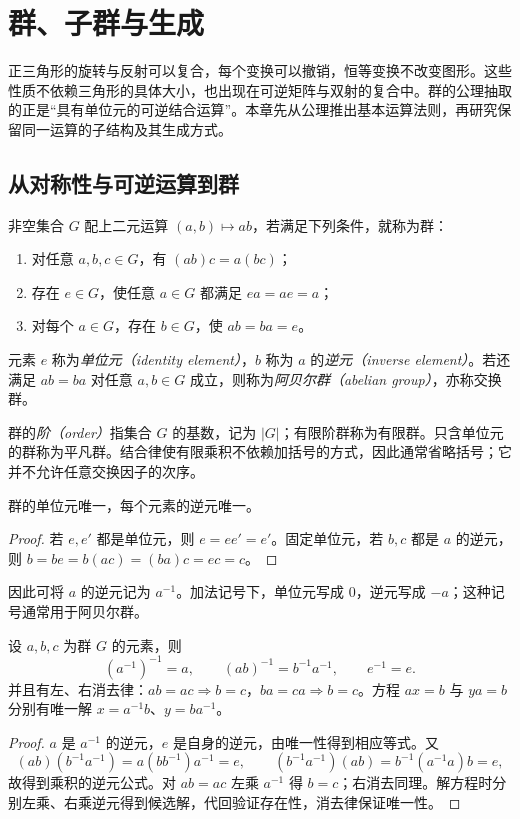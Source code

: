 \setcounter{chapter}{1} %
\chapter{群、子群与生成}\label{ch:groups}

正三角形的旋转与反射可以复合，每个变换可以撤销，恒等变换不改变图形。这些性质不依赖三角形的具体大小，也出现在可逆矩阵与双射的复合中。群的公理抽取的正是“具有单位元的可逆结合运算”。本章先从公理推出基本运算法则，再研究保留同一运算的子结构及其生成方式。

\section{从对称性与可逆运算到群}\label{sec:group-axioms}

\begin{definition}[群]
非空集合 $G$ 配上二元运算 $(a,b)\mapsto ab$，若满足下列条件，就称为群：
\begin{enumerate}
  \item 对任意 $a,b,c\in G$，有 $(ab)c=a(bc)$；
  \item 存在 $e\in G$，使任意 $a\in G$ 都满足 $ea=ae=a$；
  \item 对每个 $a\in G$，存在 $b\in G$，使 $ab=ba=e$。
\end{enumerate}
元素 $e$ 称为\emph{单位元（identity element）}，$b$ 称为 $a$ 的\emph{逆元（inverse element）}。若还满足 $ab=ba$ 对任意 $a,b\in G$ 成立，则称为\emph{阿贝尔群（abelian group）}，亦称交换群。
\end{definition}

群的\emph{阶（order）}指集合 $G$ 的基数，记为 $|G|$；有限阶群称为有限群。只含单位元的群称为平凡群。结合律使有限乘积不依赖加括号的方式，因此通常省略括号；它并不允许任意交换因子的次序。

\begin{proposition}[单位元与逆元的唯一性]\label{prop:group-uniqueness}
群的单位元唯一，每个元素的逆元唯一。
\end{proposition}
\begin{proof}
若 $e,e'$ 都是单位元，则 $e=ee'=e'$。固定单位元，若 $b,c$ 都是 $a$ 的逆元，则 $b=be=b(ac)=(ba)c=ec=c$。
\end{proof}

因此可将 $a$ 的逆元记为 $a^{-1}$。加法记号下，单位元写成 $0$，逆元写成 $-a$；这种记号通常用于阿贝尔群。

\begin{proposition}[基本运算法则]\label{prop:group-calculation}
设 $a,b,c$ 为群 $G$ 的元素，则
\[
  (a^{-1})^{-1}=a,\qquad (ab)^{-1}=b^{-1}a^{-1},\qquad e^{-1}=e.
\]
并且有左、右消去律：$ab=ac\Rightarrow b=c$，$ba=ca\Rightarrow b=c$。方程 $ax=b$ 与 $ya=b$ 分别有唯一解 $x=a^{-1}b$、$y=ba^{-1}$。
\end{proposition}
\begin{proof}
$a$ 是 $a^{-1}$ 的逆元，$e$ 是自身的逆元，由唯一性得到相应等式。又
\[
  (ab)(b^{-1}a^{-1})=a(bb^{-1})a^{-1}=e,\qquad
  (b^{-1}a^{-1})(ab)=b^{-1}(a^{-1}a)b=e,
\]
故得到乘积的逆元公式。对 $ab=ac$ 左乘 $a^{-1}$ 得 $b=c$；右消去同理。解方程时分别左乘、右乘逆元得到候选解，代回验证存在性，消去律保证唯一性。
\end{proof}

